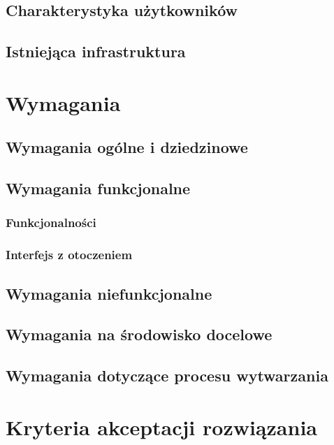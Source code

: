 \documentclass[11pt,oneside,a4paper,titlepage,onecolumn]{article}
\begin{document}
\subsection{Charakterystyka użytkowników}

\subsection{Istniejąca infrastruktura}

\section{Wymagania}

\subsection{Wymagania ogólne i dziedzinowe}

\subsection{Wymagania funkcjonalne}

\subsubsection{Funkcjonalności}

\subsubsection{Interfejs z otoczeniem}

\subsection{Wymagania niefunkcjonalne}

\subsection{Wymagania na środowisko docelowe}

\subsection{Wymagania dotyczące procesu wytwarzania}

\section{Kryteria akceptacji rozwiązania}
\end{document}
